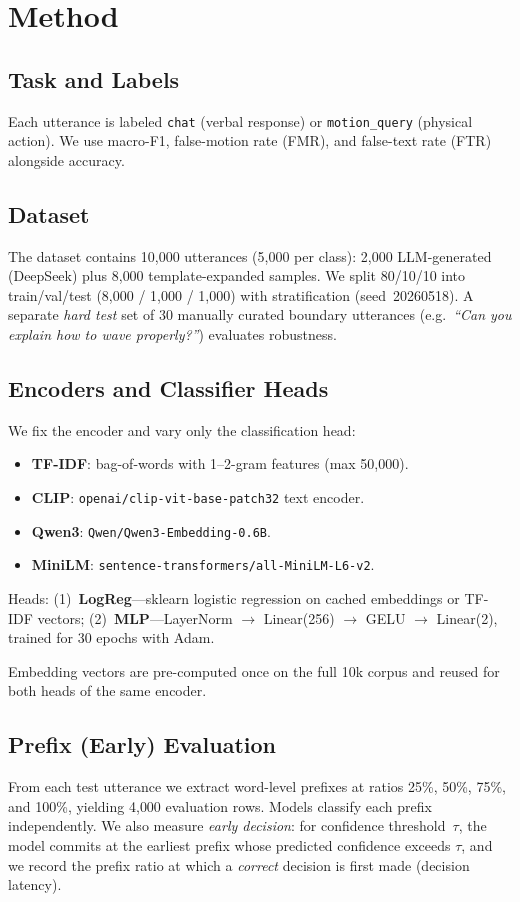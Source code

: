 \documentclass{article}
\begin{document}
\section{Method}

\subsection{Task and Labels}
Each utterance is labeled \texttt{chat} (verbal response) or
\texttt{motion\_query} (physical action).
We use macro-F1, false-motion rate (FMR), and false-text rate (FTR) alongside
accuracy.

\subsection{Dataset}
The dataset contains 10{,}000 utterances (5{,}000 per class): 2{,}000
LLM-generated (DeepSeek) plus 8{,}000 template-expanded samples.
We split 80/10/10 into train/val/test (8{,}000 / 1{,}000 / 1{,}000) with
stratification (seed~20260518).
A separate \emph{hard test} set of 30 manually curated boundary utterances
(e.g.\ \emph{``Can you explain how to wave properly?''}) evaluates
robustness.

\subsection{Encoders and Classifier Heads}
We fix the encoder and vary only the classification head:
\begin{itemize}
  \item \textbf{TF-IDF}: bag-of-words with 1--2-gram features (max 50{,}000).
  \item \textbf{CLIP}: \texttt{openai/clip-vit-base-patch32} text encoder.
  \item \textbf{Qwen3}: \texttt{Qwen/Qwen3-Embedding-0.6B}.
  \item \textbf{MiniLM}: \texttt{sentence-transformers/all-MiniLM-L6-v2}.
\end{itemize}
Heads: (1)~\textbf{LogReg}---sklearn logistic regression on cached
embeddings or TF-IDF vectors; (2)~\textbf{MLP}---LayerNorm $\to$ Linear(256)
$\to$ GELU $\to$ Linear(2), trained for 30 epochs with Adam.

Embedding vectors are pre-computed once on the full 10k corpus and reused for
both heads of the same encoder.

\subsection{Prefix (Early) Evaluation}
From each test utterance we extract word-level prefixes at ratios
25\%, 50\%, 75\%, and 100\%, yielding 4{,}000 evaluation rows.
Models classify each prefix independently.
We also measure \emph{early decision}: for confidence threshold~$\tau$,
the model commits at the earliest prefix whose predicted confidence exceeds
$\tau$, and we record the prefix ratio at which a \emph{correct} decision is
first made (decision latency).
\end{document}
